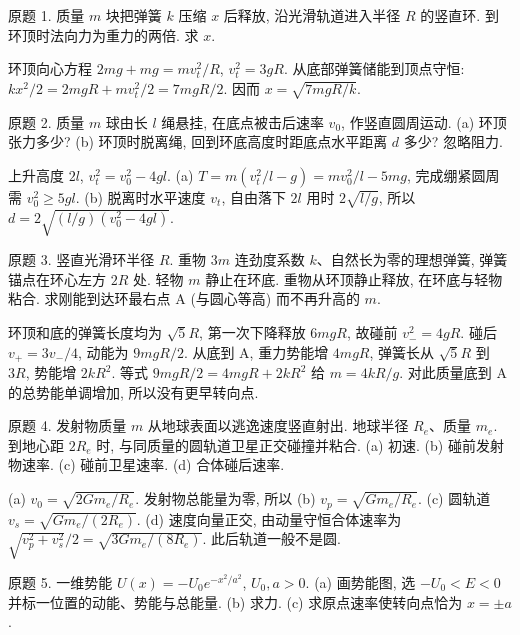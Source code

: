 \begin{exercise}
原题 1. 质量 $m$ 块把弹簧 $k$ 压缩 $x$ 后释放, 沿光滑轨道进入半径 $R$ 的竖直环. 到环顶时法向力为重力的两倍. 求 $x$.
\end{exercise}
\begin{solution}
环顶向心方程 $2mg+mg=mv_t^2/R$, $v_t^2=3gR$. 从底部弹簧储能到顶点守恒: $kx^2/2=2mgR+mv_t^2/2=7mgR/2$. 因而 $x=\sqrt{7mgR/k}$.
\end{solution}
\begin{exercise}
原题 2. 质量 $m$ 球由长 $l$ 绳悬挂, 在底点被击后速率 $v_0$, 作竖直圆周运动. (a) 环顶张力多少? (b) 环顶时脱离绳, 回到环底高度时距底点水平距离 $d$ 多少? 忽略阻力.
\end{exercise}
\begin{solution}
上升高度 $2l$, $v_t^2=v_0^2-4gl$. (a) $T=m(v_t^2/l-g)=mv_0^2/l-5mg$, 完成绷紧圆周需 $v_0^2\ge5gl$. (b) 脱离时水平速度 $v_t$, 自由落下 $2l$ 用时 $2\sqrt{l/g}$, 所以 $d=2\sqrt{(l/g)(v_0^2-4gl)}$.
\end{solution}
\begin{exercise}
原题 3. 竖直光滑环半径 $R$. 重物 $3m$ 连劲度系数 $k$、自然长为零的理想弹簧, 弹簧锚点在环心左方 $2R$ 处. 轻物 $m$ 静止在环底. 重物从环顶静止释放, 在环底与轻物粘合. 求刚能到达环最右点 A (与圆心等高) 而不再升高的 $m$.
\end{exercise}
\begin{solution}
环顶和底的弹簧长度均为 $\sqrt5R$, 第一次下降释放 $6mgR$, 故碰前 $v_-^2=4gR$. 碰后 $v_+=3v_-/4$, 动能为 $9mgR/2$. 从底到 A, 重力势能增 $4mgR$, 弹簧长从 $\sqrt5R$ 到 $3R$, 势能增 $2kR^2$. 等式 $9mgR/2=4mgR+2kR^2$ 给 $m=4kR/g$. 对此质量底到 A 的总势能单调增加, 所以没有更早转向点.
\end{solution}
\begin{exercise}
原题 4. 发射物质量 $m$ 从地球表面以逃逸速度竖直射出. 地球半径 $R_e$、质量 $m_e$. 到地心距 $2R_e$ 时, 与同质量的圆轨道卫星正交碰撞并粘合. (a) 初速. (b) 碰前发射物速率. (c) 碰前卫星速率. (d) 合体碰后速率.
\end{exercise}
\begin{solution}
(a) $v_0=\sqrt{2Gm_e/R_e}$. 发射物总能量为零, 所以 (b) $v_p=\sqrt{Gm_e/R_e}$. (c) 圆轨道 $v_s=\sqrt{Gm_e/(2R_e)}$. (d) 速度向量正交, 由动量守恒合体速率为 $\sqrt{v_p^2+v_s^2}/2=\sqrt{3Gm_e/(8R_e)}$. 此后轨道一般不是圆.
\end{solution}
\begin{exercise}
原题 5. 一维势能 $U(x)=-U_0e^{-x^2/a^2}$, $U_0,a>0$. (a) 画势能图, 选 $-U_0<E<0$ 并标一位置的动能、势能与总能量. (b) 求力. (c) 求原点速率使转向点恰为 $x=\pm a$.
\end{exercise}
